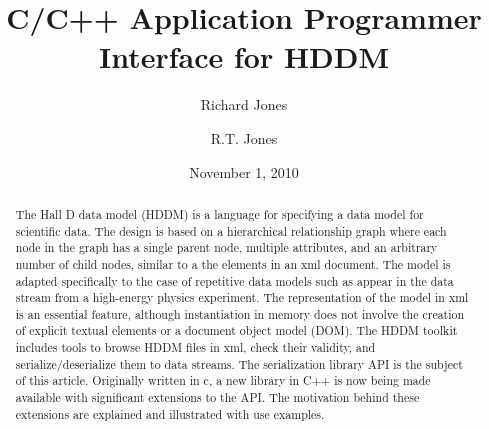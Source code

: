\documentclass{revtex4}
\begin{document}

\title{C/C++ Application Programmer Interface for HDDM}


\author{Richard Jones}
\author{R.T. Jones}


\date{November 1, 2010}

\begin{abstract}
The Hall D data model (HDDM) is a language for specifying a data model
for scientific data.  The design is based on a hierarchical relationship
graph where each node in the graph has a single parent node, multiple
attributes, and an arbitrary number of child nodes, similar to a the
elements in an xml document.
The model is adapted specifically to the case of repetitive data models
such as appear in the data stream from a high-energy physics experiment.
The representation of the model in xml is an essential feature, although
instantiation in memory does not involve the creation of explicit textual
elements or a document object model (DOM).  The HDDM toolkit includes tools
to browse HDDM files in xml, check their validity, and serialize/deserialize
them to data streams.  The serialization library API is the subject of this
article.  Originally written in c, a new library in C++ is now being made
available with significant extensions to the API.  The motivation behind
these extensions are explained and illustrated with use examples.
\end{abstract}
\end{document}
